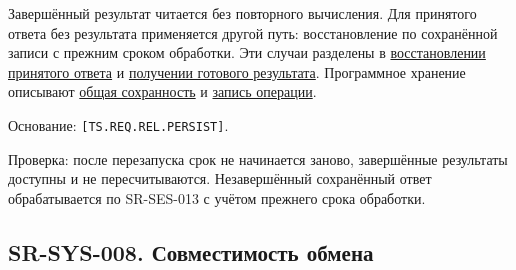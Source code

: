\documentclass[12pt,a4paper]{article}
\begin{document}
Завершённый результат читается без повторного вычисления. Для принятого ответа без результата применяется другой путь: восстановление по сохранённой записи с прежним сроком обработки. Эти случаи разделены в \hyperref[sr-ses-013-ux432ux43eux441ux441ux442ux430ux43dux43eux432ux43bux435ux43dux438ux435-ux43fux440ux438ux43dux44fux442ux43eux433ux43e-ux43eux442ux432ux435ux442ux430]{восстановлении принятого ответа} и \hyperref[sr-ses-014-ux43fux43eux43bux443ux447ux435ux43dux438ux435-ux441ux43eux445ux440ux430ux43dux451ux43dux43dux43eux433ux43e-ux440ux435ux437ux443ux43bux44cux442ux430ux442ux430]{получении готового результата}. Программное хранение описывают \href{../07_\%D0\%9F\%D1\%80\%D0\%BE\%D0\%B3\%D1\%80\%D0\%B0\%D0\%BC\%D0\%BC\%D0\%BD\%D1\%8B\%D0\%B5_\%D1\%82\%D1\%80\%D0\%B5\%D0\%B1\%D0\%BE\%D0\%B2\%D0\%B0\%D0\%BD\%D0\%B8\%D1\%8F/DOC-06_\%D0\%9F\%D1\%80\%D0\%BE\%D0\%B3\%D1\%80\%D0\%B0\%D0\%BC\%D0\%BC\%D0\%BD\%D1\%8B\%D0\%B5_\%D1\%82\%D1\%80\%D0\%B5\%D0\%B1\%D0\%BE\%D0\%B2\%D0\%B0\%D0\%BD\%D0\%B8\%D1\%8F.pdf\#nameddest=swr-sys-008-\%D1\%81\%D0\%BE\%D1\%85\%D1\%80\%D0\%B0\%D0\%BD\%D0\%BD\%D0\%BE\%D1\%81\%D1\%82\%D1\%8C-\%D0\%B7\%D0\%B0\%D0\%B2\%D0\%B5\%D1\%80\%D1\%88\%D1\%91\%D0\%BD\%D0\%BD\%D1\%8B\%D1\%85-\%D0\%B4\%D0\%B0\%D0\%BD\%D0\%BD\%D1\%8B\%D1\%85}{общая сохранность} и \href{../07_\%D0\%9F\%D1\%80\%D0\%BE\%D0\%B3\%D1\%80\%D0\%B0\%D0\%BC\%D0\%BC\%D0\%BD\%D1\%8B\%D0\%B5_\%D1\%82\%D1\%80\%D0\%B5\%D0\%B1\%D0\%BE\%D0\%B2\%D0\%B0\%D0\%BD\%D0\%B8\%D1\%8F/DOC-06.2_\%D0\%A1\%D0\%B5\%D1\%81\%D1\%81\%D0\%B8\%D0\%B8_\%D0\%B7\%D0\%B0\%D0\%B4\%D0\%B0\%D1\%87_\%D0\%B8_\%D0\%BF\%D0\%BB\%D0\%B0\%D0\%BD\%D0\%B8\%D1\%80\%D0\%BE\%D0\%B2\%D1\%89\%D0\%B8\%D0\%BA.pdf\#nameddest=swr-ses-021-\%D0\%B7\%D0\%B0\%D0\%BF\%D0\%B8\%D1\%81\%D1\%8C-\%D0\%BF\%D1\%80\%D0\%B8\%D0\%BD\%D1\%8F\%D1\%82\%D0\%BE\%D0\%B9-\%D0\%BE\%D0\%BF\%D0\%B5\%D1\%80\%D0\%B0\%D1\%86\%D0\%B8\%D0\%B8}{запись операции}.

Основание: \texttt{[TS.\allowbreak{}REQ.\allowbreak{}REL.\allowbreak{}PERSIST]}.

Проверка: после перезапуска срок не начинается заново, завершённые результаты доступны и не пересчитываются. Незавершённый сохранённый ответ обрабатывается по SR-SES-013 с учётом прежнего срока обработки.

\subsection{SR-SYS-008. Совместимость обмена}\label{sr-sys-008-ux441ux43eux432ux43cux435ux441ux442ux438ux43cux43eux441ux442ux44c-ux43eux431ux43cux435ux43dux430}
\end{document}
